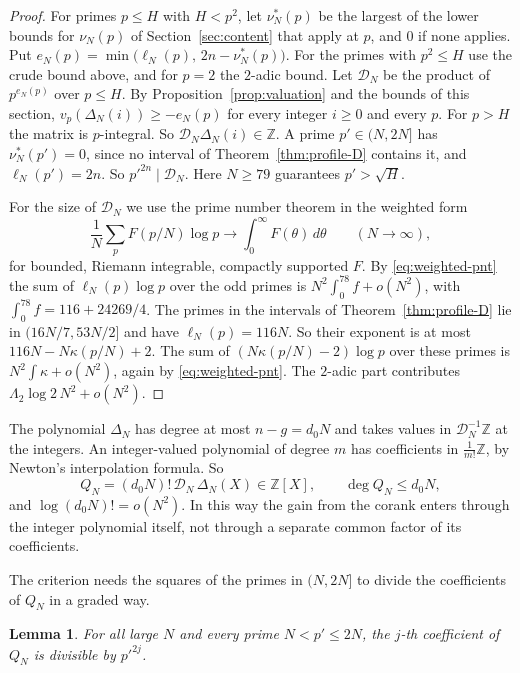 \documentclass[11pt]{amsart}
\newtheorem{lemma}[theorem]{Lemma}
\theoremstyle{definition}
\theoremstyle{remark}
\numberwithin{equation}{section}
\newcommand{\Z}{\mathbb Z}
\newcommand{\cD}{\mathcal D}
\begin{document}
\begin{proof}
For primes $p\le H$ with $H<p^2$, let $\nu^*_N(p)$ be the largest of the lower bounds for $\nu_N(p)$ of
Section~\ref{sec:content} that apply at $p$, and $0$ if none applies. Put
$e_N(p)=\min\bigl(\ell_N(p),\,2n-\nu^*_N(p)\bigr)$. For the primes with $p^2\le H$ use the crude bound
above, and for $p=2$ the $2$-adic bound. Let $\cD_N$ be the product of $p^{e_N(p)}$ over $p\le H$. By
Proposition~\ref{prop:valuation} and the bounds of this section, $v_p(\Delta_N(i))\ge-e_N(p)$ for every
integer $i\ge0$ and every $p$. For $p>H$ the matrix is $p$-integral. So $\cD_N\Delta_N(i)\in\Z$. A prime
$p'\in(N,2N]$ has $\nu^*_N(p')=0$, since no interval of Theorem~\ref{thm:profile-D} contains it, and
$\ell_N(p')=2n$. So $p'^{2n}\mid\cD_N$. Here $N\ge79$ guarantees $p'>\sqrt H$.

For the size of $\cD_N$ we use the prime number theorem in the weighted form
\begin{equation}\label{eq:weighted-pnt}
 \frac1N\sum_{p}F(p/N)\log p\longrightarrow\int_0^\infty F(\theta)\,d\theta\qquad(N\to\infty),
\end{equation}
for bounded, Riemann integrable, compactly supported $F$. By \eqref{eq:weighted-pnt} the sum of
$\ell_N(p)\log p$ over the odd primes is $N^2\int_0^{78}f+o(N^2)$, with $\int_0^{78}f=116+24269/4$. The primes in
the intervals of Theorem~\ref{thm:profile-D} lie in $(16N/7,53N/2]$ and have $\ell_N(p)=116N$. So their
exponent is at most $116N-N\kappa(p/N)+2$. The sum of $(N\kappa(p/N)-2)\log p$ over these primes is
$N^2\int\kappa+o(N^2)$, again by \eqref{eq:weighted-pnt}. The $2$-adic part contributes
$\Lambda_2\log2\,N^2+o(N^2)$.
\end{proof}

The polynomial $\Delta_N$ has degree at most $n-g=d_0N$ and takes values in $\cD_N^{-1}\Z$ at the integers.
An integer-valued polynomial of degree $m$ has coefficients in $\frac1{m!}\Z$, by Newton's interpolation
formula. So
\begin{equation}\label{eq:QN}
 Q_N=(d_0N)!\,\cD_N\,\Delta_N(X)\in\Z[X],\qquad \deg Q_N\le d_0N,
\end{equation}
and $\log(d_0N)!=o(N^2)$. In this way the gain from the corank enters through the integer polynomial
itself, not through a separate common factor of its coefficients.

The criterion needs the squares of the primes in $(N,2N]$ to divide the coefficients of $Q_N$ in a graded
way.

\begin{lemma}\label{lem:squares}
For all large $N$ and every prime $N<p'\le2N$, the $j$-th coefficient of $Q_N$ is divisible by $p'^{2j}$.
\end{lemma}
\end{document}
